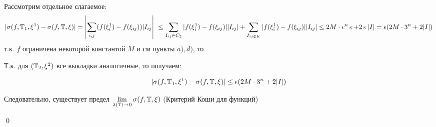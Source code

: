 \documentclass[a4paper]{article}
\begin{document}
\begin{itemize}
    Рассмотрим отдельное слагаемое:
    \begin{equation*}
        \begin{aligned}
            |\sigma(f, \T_1, \xi^1) - \sigma(f, \T, \xi)| = \left|\sum_{i, j}(f(\xi_i^1) - f(\xi_{ij}))|I_{ij}\right|\
            \le \sum_{I_{ij}\in C_3}|f(\xi_i^1) - f(\xi_{ij})||I_{ij}| + \sum_{I_{ij\in K}}|f(\xi_i^1)-f(\xi_{ij})||I_{ij}|\le 2M\cdot e^n\ve + 2\ve |I| = \epsilon(2M\cdot 3^n + 2|I|)
        \end{aligned}
    \end{equation*}
    т.к. $f$ ограничена некоторой константой $M$ и см пункты $a), d)$, то

    Т.к. для $(\operatorname{\mathbb{T}}_2, \xi^2)$ все выкладки аналогичные, то получаем:
    
    \begin{equation*}
         |\sigma(f, \operatorname{\mathbb{T}}_1, \xi^1) - \sigma(f, \operatorname{\mathbb{T}}, \xi)| \le \epsilon(2M\cdot 3^n + 2|I|)
    \end{equation*}

        Следовательно, существует предел $\displaystyle\lim_{\lambda(\operatorname{\mathbb{T}})\to0}\sigma(f, \operatorname{\mathbb{T}}, \xi)$ (Критерий Коши для функций)
\end{itemize} \qed
\end{document}
